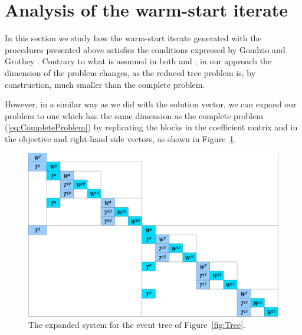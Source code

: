 
%
%
\section{Analysis of the warm-start iterate}
\label{sec:Analysis}

In this section we study how the warm-start iterate generated with 
the procedures presented above satisfies the conditions expressed by 
Gondzio and Grothey \cite{GondzioGrothey03}. 
Contrary to what is assumed in both \cite{YildirimWright} and 
\cite{GondzioGrothey03}, in our approach the dimension of the problem changes, 
as the reduced tree problem is, by construction, much smaller than the 
complete problem.

However, in a similar way as we did with the solution vector, 
we can expand our problem to one which has the same dimension 
as the complete problem (\ref{eq:CompleteProblem}) by replicating
the blocks in the coefficient matrix and in the objective and right-hand 
side vectors, as shown in Figure~\ref{fig:ExpandedSystem}.
%
\begin{figure}[ht]
  \begin{center}
    \includegraphics[scale=.50]{figures/expandedsystem.eps}
    \caption{The expanded system for the event tree of Figure~\ref{fig:Tree}.}
    \label{fig:ExpandedSystem}
  \end{center}
  \vspace{-3ex}
\end{figure}

